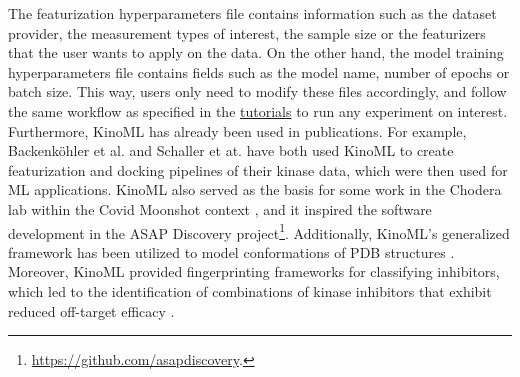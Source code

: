 \documentclass[9pt,lessons]{livecoms}
\begin{document}
The featurization hyperparameters file contains information such as the dataset provider, the measurement types of interest, the sample size or the featurizers that the user wants to apply on the data. On the other hand, the model training hyperparameters file contains fields such as the model name, number of epochs or batch size. This way, users only need to modify these files accordingly, and follow the same workflow as specified in the \hyperlink{https://github.com/openkinome/kinoml/tree/master/tutorials/experiments}{tutorials} to run any experiment on interest.\\

Furthermore, KinoML has already been used in  publications. For example, Backenköhler et al. \cite{backenkohler2023guided} and Schaller et at. \cite{schaller2023benchmarking} have both used KinoML to create featurization and docking pipelines of their kinase data, which were then used for ML applications. 
KinoML also served as the basis for some work in the Chodera lab within the Covid Moonshot context \cite{Boby2023}, and it inspired the software development in the ASAP Discovery project\footnote{\href{https://github.com/asapdiscovery}{https://github.com/asapdiscovery}.}. Additionally, KinoML's generalized framework has been utilized to model conformations of PDB structures \cite{Perner2023}. Moreover, KinoML provided fingerprinting frameworks for classifying inhibitors, which led to the identification of combinations of kinase inhibitors that exhibit reduced off-target efficacy \cite{Outhwaite2023}.

\end{document}
